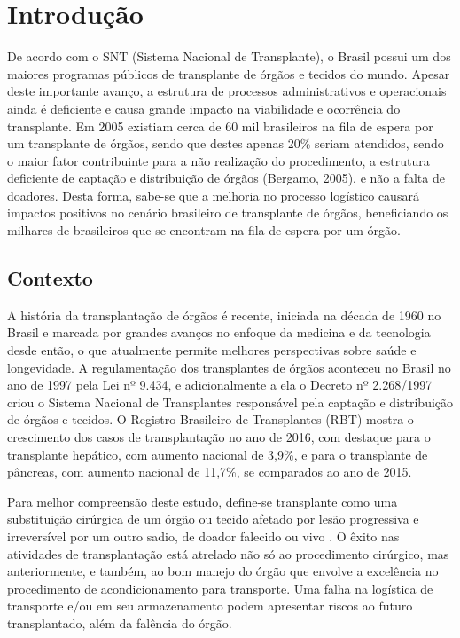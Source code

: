 \chapter[Introdução]{Introdução}

De acordo com o SNT (Sistema Nacional de Transplante), o Brasil possui um dos maiores programas públicos de transplante de órgãos e tecidos do mundo. Apesar deste importante avanço, a estrutura de processos administrativos e operacionais ainda é deficiente e causa grande impacto na viabilidade e ocorrência do transplante. Em 2005 existiam cerca de 60 mil brasileiros na fila de espera por um transplante de órgãos, sendo que destes apenas 20\% seriam atendidos, sendo o maior fator contribuinte para a não realização do procedimento, a estrutura deficiente de captação e distribuição de órgãos (Bergamo, 2005), e não a falta de doadores.
Desta forma, sabe-se que a melhoria no processo logístico causará impactos positivos no cenário brasileiro de transplante de órgãos, beneficiando os milhares de brasileiros que se encontram na fila de espera por um órgão. 

\section{Contexto}

A história da transplantação de órgãos é recente, iniciada na década de 1960 no Brasil e marcada por grandes avanços no enfoque da medicina e da tecnologia desde então, o que atualmente permite melhores perspectivas sobre saúde e longevidade. A regulamentação dos transplantes de órgãos aconteceu no Brasil no ano de 1997 pela Lei nº 9.434, e adicionalmente a ela o Decreto nº 2.268/1997 criou o Sistema Nacional de Transplantes responsável pela captação e distribuição de órgãos e tecidos. O Registro Brasileiro de Transplantes (RBT) mostra o crescimento dos casos de transplantação no ano de 2016, com destaque para o transplante hepático, com aumento nacional de 3,9\%, e para o transplante de pâncreas, com aumento nacional de 11,7\%, se comparados ao ano de 2015.

Para melhor compreensão deste estudo, define-se transplante como uma substituição cirúrgica de um órgão ou tecido afetado por lesão progressiva e irreversível por um outro sadio, de doador falecido ou vivo \cite{neto}. O êxito nas atividades de transplantação está atrelado não só ao procedimento cirúrgico, mas anteriormente, e também, ao bom manejo do órgão que envolve a excelência no procedimento de acondicionamento para transporte. Uma falha na logística de transporte e/ou em seu armazenamento podem apresentar riscos ao futuro transplantado, além da falência do órgão.

